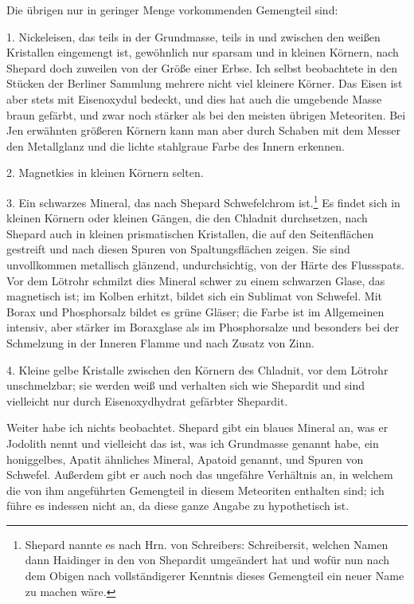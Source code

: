 \documentclass[a4paper, 11pt, oneside]{article}
\begin{document}
Die übrigen nur in geringer Menge vorkommenden Gemengteil sind:

1. Nickeleisen, das teils in der Grundmasse, teils in und zwischen den weißen Kristallen eingemengt ist, gewöhnlich nur sparsam und in kleinen Körnern, nach Shepard doch zuweilen von der Größe einer Erbse. Ich selbst beobachtete in den Stücken der Berliner Sammlung mehrere nicht viel kleinere Körner. Das Eisen ist aber stets mit Eisenoxydul bedeckt, und dies hat auch die umgebende Masse braun gefärbt, und zwar noch stärker als bei den meisten übrigen Meteoriten. Bei Jen erwähnten größeren Körnern kann man aber durch Schaben mit dem Messer den Metallglanz und die lichte stahlgraue Farbe des Innern erkennen.

2. Magnetkies in kleinen Körnern selten.

3. Ein schwarzes Mineral, das nach Shepard Schwefelchrom ist.\footnote{Shepard nannte es nach Hrn. von Schreibers: Schreibersit, welchen Namen dann Haidinger in den von Shepardit umgeändert hat und wofür nun nach dem Obigen nach vollständigerer Kenntnis dieses Gemengteil ein neuer Name zu machen wäre.} Es findet sich in kleinen Körnern oder kleinen Gängen, die den Chladnit durchsetzen, nach Shepard auch in kleinen prismatischen Kristallen, die auf den Seitenflächen gestreift und nach diesen Spuren von Spaltungsflächen zeigen. Sie sind unvollkommen metallisch glänzend, undurchsichtig, von der Härte des Flussspats. Vor dem Lötrohr schmilzt dies Mineral schwer zu einem schwarzen Glase, das magnetisch ist; im Kolben erhitzt, bildet sich ein Sublimat von Schwefel. Mit Borax und Phosphorsalz bildet es grüne Gläser; die Farbe ist im Allgemeinen intensiv, aber stärker im Boraxglase als im Phosphorsalze und besonders bei der Schmelzung in der Inneren Flamme und nach Zusatz von Zinn.

4. Kleine gelbe Kristalle zwischen den Körnern des Chladnit, vor dem Lötrohr unschmelzbar; sie werden weiß und verhalten sich wie Shepardit und sind vielleicht nur durch Eisenoxydhydrat gefärbter Shepardit.

Weiter habe ich nichts beobachtet. Shepard gibt ein blaues Mineral an, was er Jodolith nennt und vielleicht das ist, was ich Grundmasse genannt habe, ein honiggelbes, Apatit ähnliches Mineral, Apatoid genannt, und Spuren von Schwefel. Außerdem gibt er auch noch das ungefähre Verhältnis an, in welchem die von ihm angeführten Gemengteil in diesem Meteoriten enthalten sind; ich führe es indessen nicht an, da diese ganze Angabe zu hypothetisch ist.
\end{document}
